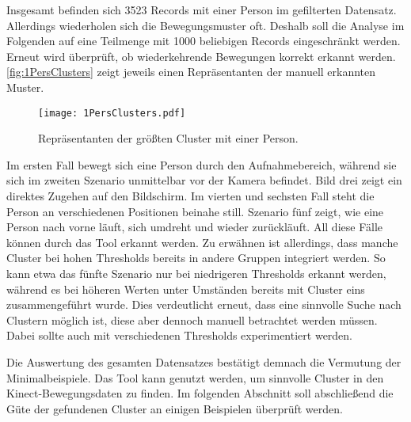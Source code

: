 Insgesamt befinden sich 3523 Records mit einer Person im gefilterten Datensatz.
Allerdings wiederholen sich die Bewegungsmuster oft.
Deshalb soll die Analyse im Folgenden auf eine Teilmenge mit 1000 beliebigen Records eingeschränkt werden.
Erneut wird überprüft, ob wiederkehrende Bewegungen korrekt erkannt werden.
\autoref{fig:1PersClusters} zeigt jeweils einen Repräsentanten der manuell erkannten Muster.
\begin{figure}[ht]
    \begin{center}
    \texttt{[image: 1PersClusters.pdf]}
    \end{center}
    \caption{Repräsentanten der größten Cluster mit einer Person.}
    \label{fig:1PersClusters}
\end{figure}
Im ersten Fall bewegt sich eine Person durch den Aufnahmebereich,
während sie sich im zweiten Szenario unmittelbar vor der Kamera befindet.
Bild drei zeigt ein direktes Zugehen auf den Bildschirm.
Im vierten und sechsten Fall steht die Person an verschiedenen Positionen beinahe still.
Szenario fünf zeigt, wie eine Person nach vorne läuft,
sich umdreht und wieder zurückläuft.
All diese Fälle können durch das Tool erkannt werden.
Zu erwähnen ist allerdings, dass manche Cluster bei hohen Thresholds bereits in andere Gruppen integriert werden.
So kann etwa das fünfte Szenario nur bei niedrigeren Thresholds erkannt werden,
während es bei höheren Werten unter Umständen bereits mit Cluster eins zusammengeführt wurde.
Dies verdeutlicht erneut, dass eine sinnvolle Suche nach Clustern möglich ist,
diese aber dennoch manuell betrachtet werden müssen.
Dabei sollte auch mit verschiedenen Thresholds experimentiert werden.

Die Auswertung des gesamten Datensatzes bestätigt demnach die Vermutung der Minimalbeispiele.
Das Tool kann genutzt werden, um sinnvolle Cluster in den Kinect-Bewegungsdaten zu finden.
Im folgenden Abschnitt soll abschließend die Güte der gefundenen Cluster an einigen Beispielen
überprüft werden.

